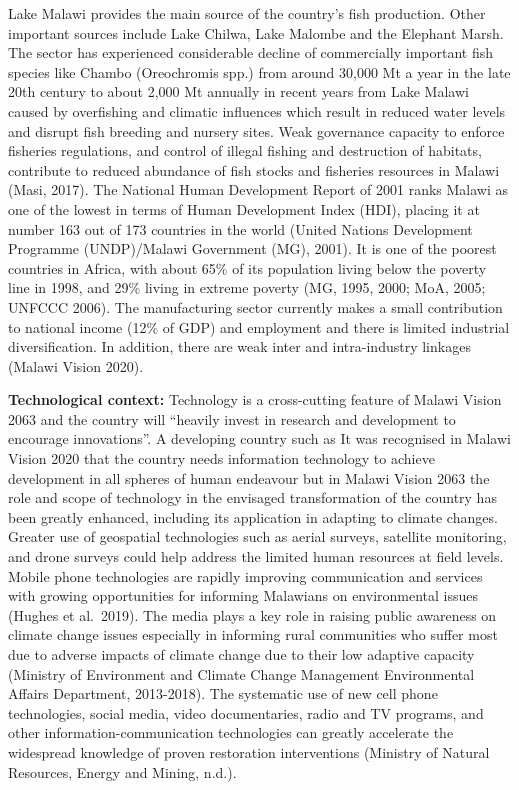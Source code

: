 \documentclass[
]{book}
\begin{document}
Lake Malawi provides the main source of the country's fish production. Other important sources include Lake Chilwa, Lake Malombe and the Elephant Marsh. The sector has experienced considerable decline of commercially important fish species like Chambo (Oreochromis spp.) from around 30,000 Mt a year in the late 20th century to about 2,000 Mt annually in recent years from Lake Malawi caused by overfishing and climatic influences which result in reduced water levels and disrupt fish breeding and nursery sites. Weak governance capacity to enforce fisheries regulations, and control of illegal fishing and destruction of habitats, contribute to reduced abundance of fish stocks and fisheries resources in Malawi (Masi, 2017). The National Human Development Report of 2001 ranks Malawi as one of the lowest in terms of Human Development Index (HDI), placing it at number 163 out of 173 countries in the world (United Nations Development Programme (UNDP)/Malawi Government (MG), 2001). It is one of the poorest countries in Africa, with about 65\% of its population living below the poverty line in 1998, and 29\% living in extreme poverty (MG, 1995, 2000; MoA, 2005; UNFCCC 2006). The manufacturing sector currently makes a small contribution to national income (12\% of GDP) and employment and there is limited industrial diversification. In addition, there are weak inter and intra-industry linkages (Malawi Vision 2020).

\textbf{Technological context:} Technology is a cross-cutting feature of Malawi Vision 2063 and the country will ``heavily invest in research and development to encourage innovations''. A developing country such as It was recognised in Malawi Vision 2020 that the country needs information technology to achieve development in all spheres of human endeavour but in Malawi Vision 2063 the role and scope of technology in the envisaged transformation of the country has been greatly enhanced, including its application in adapting to climate changes. Greater use of geospatial technologies such as aerial surveys, satellite monitoring, and drone surveys could help address the limited human resources at field levels. Mobile phone technologies are rapidly improving communication and services with growing opportunities for informing Malawians on environmental issues (Hughes et al.~2019). The media plays a key role in raising public awareness on climate change issues especially in informing rural communities who suffer most due to adverse impacts of climate change due to their low adaptive capacity (Ministry of Environment and Climate Change Management Environmental Affairs Department, 2013-2018). The systematic use of new cell phone technologies, social media, video documentaries, radio and TV programs, and other information-communication technologies can greatly accelerate the widespread knowledge of proven restoration interventions (Ministry of Natural Resources, Energy and Mining, n.d.).
\end{document}
